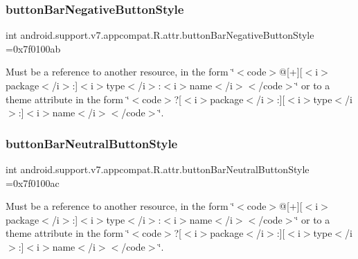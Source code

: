 \subsubsection{\texorpdfstring{button\+Bar\+Negative\+Button\+Style}{buttonBarNegativeButtonStyle}}
{\footnotesize\ttfamily int android.\+support.\+v7.\+appcompat.\+R.\+attr.\+button\+Bar\+Negative\+Button\+Style =0x7f0100ab\hspace{0.3cm}{\ttfamily [static]}}

Must be a reference to another resource, in the form \char`\"{}$<$code$>$@\mbox{[}+\mbox{]}\mbox{[}$<$i$>$package$<$/i$>$\+:\mbox{]}$<$i$>$type$<$/i$>$\+:$<$i$>$name$<$/i$>$$<$/code$>$\char`\"{} or to a theme attribute in the form \char`\"{}$<$code$>$?\mbox{[}$<$i$>$package$<$/i$>$\+:\mbox{]}\mbox{[}$<$i$>$type$<$/i$>$\+:\mbox{]}$<$i$>$name$<$/i$>$$<$/code$>$\char`\"{}. \mbox{\label{classandroid_1_1support_1_1v7_1_1appcompat_1_1R_1_1attr_abd23fc1a59a95a9af1c5648bc93cb339}} 
\subsubsection{\texorpdfstring{button\+Bar\+Neutral\+Button\+Style}{buttonBarNeutralButtonStyle}}
{\footnotesize\ttfamily int android.\+support.\+v7.\+appcompat.\+R.\+attr.\+button\+Bar\+Neutral\+Button\+Style =0x7f0100ac\hspace{0.3cm}{\ttfamily [static]}}

Must be a reference to another resource, in the form \char`\"{}$<$code$>$@\mbox{[}+\mbox{]}\mbox{[}$<$i$>$package$<$/i$>$\+:\mbox{]}$<$i$>$type$<$/i$>$\+:$<$i$>$name$<$/i$>$$<$/code$>$\char`\"{} or to a theme attribute in the form \char`\"{}$<$code$>$?\mbox{[}$<$i$>$package$<$/i$>$\+:\mbox{]}\mbox{[}$<$i$>$type$<$/i$>$\+:\mbox{]}$<$i$>$name$<$/i$>$$<$/code$>$\char`\"{}. \mbox{\label{classandroid_1_1support_1_1v7_1_1appcompat_1_1R_1_1attr_a919556ddd9405e7315143fdba7448487}} 
